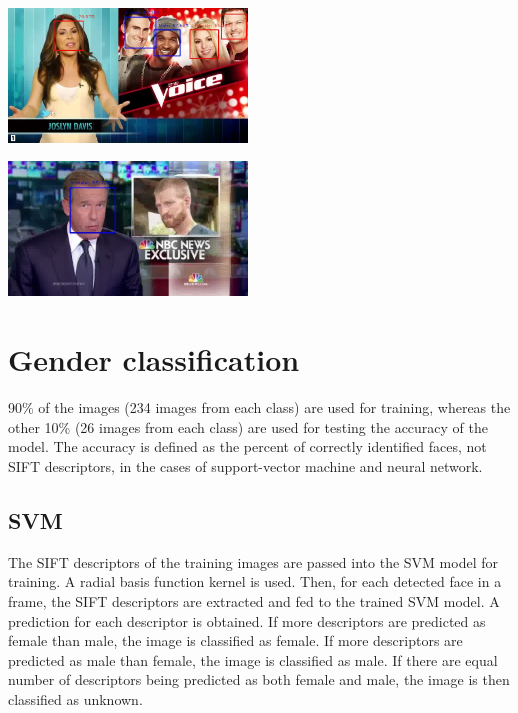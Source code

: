 \documentclass{article}
\begin{document}
\vspace*{10pt}
\begin{minipage}{0.5\linewidth}
 \label{fig: face_good}
\centering
\includegraphics[width=2.5in]{../output/clip_2/069.jpg}
\end{minipage}
\begin{minipage}{0.5\linewidth}
 \label{fig: face_bad}
\centering
\includegraphics[width=2.5in]{../output/clip_1_face/110.jpg}
\end{minipage}
\vspace*{10pt}

\section{Gender classification}
90\% of the images (234 images from each class) are used for training, whereas the other 10\% (26 images from each class) are used for testing the accuracy of the model. The accuracy is defined as the percent of correctly identified faces, not SIFT descriptors, in the cases of support-vector machine and neural network.

\subsection*{SVM}
The SIFT descriptors of the training images are passed into the SVM model for training. A radial basis function kernel is used.
Then, for each detected face in a frame, the SIFT descriptors are extracted and fed to the trained SVM model. A prediction for each descriptor is obtained. If more descriptors are predicted as female than male, the image is classified as female. If more descriptors are predicted as male than female, the image is classified as male. If there are equal number of descriptors being predicted as both female and male, the image is then classified as unknown.
\end{document}
